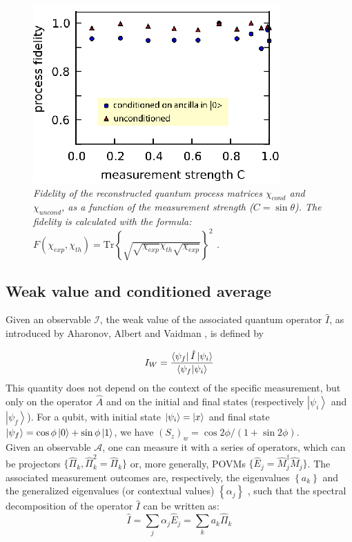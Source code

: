 \begin{figure} 
\centering
\includegraphics [width = 6 cm]{SOM/fig06_QPTfidelity.eps}
\caption{\textit{ Fidelity of the reconstructed quantum process matrices $\chi_{cond}$ and $\chi_{uncond}$, as a function of the measurement strength ($C = \sin\theta$). The fidelity is calculated with the formula: $F (\chi_{exp}, \chi_{th})  = \mbox{Tr} \left \lbrace \sqrt{\sqrt{\chi_{exp}} \chi_{th} \sqrt{\chi_{exp}}} \right\rbrace^2$ \cite{Bongioanni_Phys.Rev.A_2010}.}}
\label{fig:QPT_fid}
\end{figure} 

\subsection {Weak value and conditioned average}
Given an observable $\mathcal{I}$, the weak value of the associated quantum operator $\hat{I}$, as introduced by Aharonov, Albert and Vaidman \cite{Aharonov_PRL_1988,Kofman_PhysicsReports_2012}, is defined by

\begin{equation}
\label{eq:wv}
 I_W = \frac{ \left<\psi_f\right| \hat{I} \left|\psi_i\right>}{\left \langle \psi_f | \psi_i \right \rangle }
\end{equation}
This quantity does not depend on the context of the specific measurement, but only on the operator $\hat{A}$ and on the initial and final states (respectively $\left| \psi_i \right \rangle$ and $\left| \psi_f \right \rangle$). For a qubit, with initial state $\left|\psi_i\right> = \left|x\right>$ and final state $\left|\psi_f\right>  = \cos \phi \left|0\right> + \sin \phi \left|1\right>$, we have $(S_z)_w = \cos 2\phi/(1+\sin 2\phi)$.\\
Given an observable $\mathcal{A}$, one can measure it with a series of operators, which can be projectors $\lbrace \hat{\Pi}_k , \hat{\Pi}_k^2 = \hat{\Pi}_k\rbrace$ or, more generally, POVMs $\lbrace \hat{E}_j = \hat{M}^{\dagger}_j \hat{M}_j \rbrace$. The associated measurement outcomes are, respectively, the eigenvalues $\left \lbrace a_k \right \rbrace$ and the generalized eigenvalues (or contextual values) $\left \lbrace \alpha_j \right \rbrace$ \cite{Dressel_Phys.Rev.Lett._2010}, such that the spectral decomposition of the operator $\hat{I}$ can be written as:
\begin{equation}
 \hat{I} = \sum_j \alpha_j \hat{E}_j = \sum_k a_k \hat{\Pi}_k
\end{equation}


